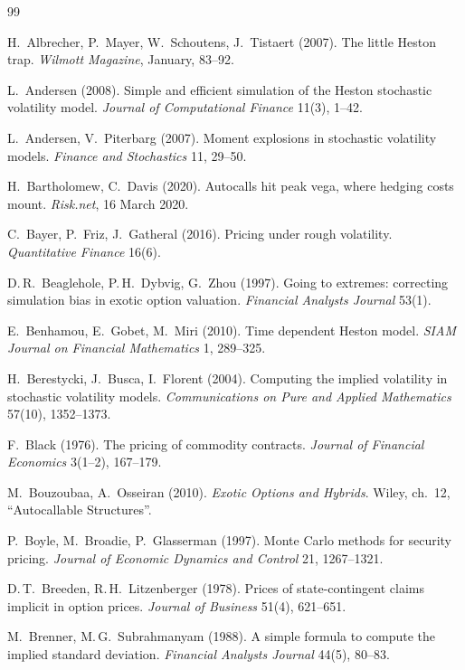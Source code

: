 \begin{thebibliography}{99}
\setlength{\itemsep}{2pt}

H.~Albrecher, P.~Mayer, W.~Schoutens, J.~Tistaert (2007).
The little Heston trap.
\emph{Wilmott Magazine}, January, 83--92.

L.~Andersen (2008).
Simple and efficient simulation of the Heston stochastic volatility model.
\emph{Journal of Computational Finance} 11(3), 1--42.

L.~Andersen, V.~Piterbarg (2007).
Moment explosions in stochastic volatility models.
\emph{Finance and Stochastics} 11, 29--50.

H.~Bartholomew, C.~Davis (2020).
Autocalls hit peak vega, where hedging costs mount.
\emph{Risk.net}, 16 March 2020.

C.~Bayer, P.~Friz, J.~Gatheral (2016).
Pricing under rough volatility.
\emph{Quantitative Finance} 16(6).

D.\,R.~Beaglehole, P.\,H.~Dybvig, G.~Zhou (1997).
Going to extremes: correcting simulation bias in exotic option valuation.
\emph{Financial Analysts Journal} 53(1).

E.~Benhamou, E.~Gobet, M.~Miri (2010).
Time dependent Heston model.
\emph{SIAM Journal on Financial Mathematics} 1, 289--325.

H.~Berestycki, J.~Busca, I.~Florent (2004).
Computing the implied volatility in stochastic volatility models.
\emph{Communications on Pure and Applied Mathematics} 57(10), 1352--1373.

F.~Black (1976).
The pricing of commodity contracts.
\emph{Journal of Financial Economics} 3(1--2), 167--179.

M.~Bouzoubaa, A.~Osseiran (2010).
\emph{Exotic Options and Hybrids}.
Wiley, ch.~12, ``Autocallable Structures''.

P.~Boyle, M.~Broadie, P.~Glasserman (1997).
Monte Carlo methods for security pricing.
\emph{Journal of Economic Dynamics and Control} 21, 1267--1321.

D.\,T.~Breeden, R.\,H.~Litzenberger (1978).
Prices of state-contingent claims implicit in option prices.
\emph{Journal of Business} 51(4), 621--651.

M.~Brenner, M.\,G.~Subrahmanyam (1988).
A simple formula to compute the implied standard deviation.
\emph{Financial Analysts Journal} 44(5), 80--83.


\end{thebibliography}
